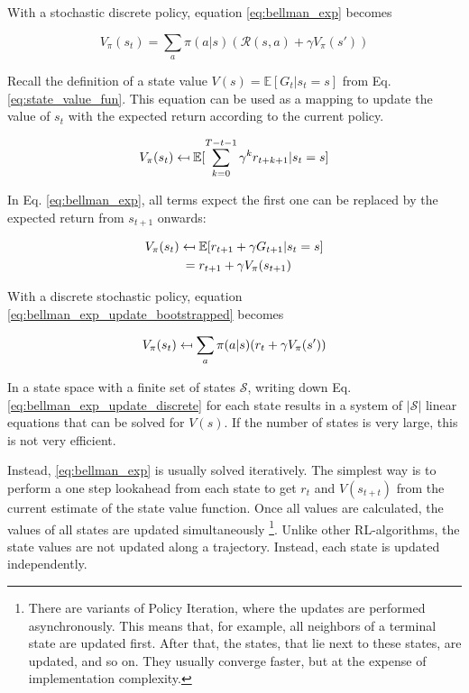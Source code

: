 With a stochastic discrete policy, equation \ref{eq:bellman_exp} becomes

\begin{equation}
V_\pi(s_t)=\sum_{a}\pi(a|s)(\mathcal{R}(s,a)+\gamma V_\pi(s'))
\label{eq:bellman_exp_discrete_policy}
\end{equation}

Recall the definition of a state value $V(s) = \mathbb{E}[G_t|s_t=s]$ from Eq. \ref{eq:state_value_fun}. This equation can be used as a mapping to update the value of $s_t$ with the expected return according to the current policy.

\begin{equation}
V_\pi(s_t) \mathrel{\reflectbox{\ensuremath{\mapsto}}} \mathbb{E}[ \sum_{k=0}^{T-t-1}\gamma^k r_{t+k+1}|s_t=s]
\label{eq:bellman_exp_update}
\end{equation}

In Eq. \ref{eq:bellman_exp}, all terms expect the first one can be replaced by the expected return from $s_{t+1}$ onwards:

\begin{align}
V_\pi(s_t) \mathrel{\reflectbox{\ensuremath{\mapsto}}} 
&\;\mathbb{E}[r_{t+1}+\gamma G_{t+1}|s_t=s]\\
=&\;r_{t+1}+\gamma V_\pi(s_{t+1})
\label{eq:bellman_exp_update_bootstrapped}
\end{align}

With a discrete stochastic policy, equation \ref{eq:bellman_exp_update_bootstrapped} becomes


\begin{equation}
V_{\pi}(s_t) \mathrel{\reflectbox{\ensuremath{\mapsto}}} \sum_{a}\pi(a|s)(r_t+\gamma V_\pi(s'))
\label{eq:bellman_exp_update_discrete}
\end{equation}

In a state space with a finite set of states $\mathcal{S}$, writing down Eq. \ref{eq:bellman_exp_update_discrete} for each state results in a system of $|\mathcal{S}|$ linear equations that can be solved for $V(s)$. If the number of states is very large, this is not very efficient. 

Instead, \ref{eq:bellman_exp} is usually solved iteratively. The simplest way is to perform a one step lookahead from each state to get $r_t$ and $V(s_{t+t})$ from the current estimate of the state value function. Once all values are calculated, the values of all states are updated simultaneously \footnote{There are variants of Policy Iteration, where the updates are performed asynchronously. This means that, for example, all neighbors of a terminal state are updated first. After that, the states, that lie next to these states, are updated, and so on. They usually converge faster, but at the expense of implementation complexity.}. Unlike other RL-algorithms, the state values are not updated along a trajectory. Instead, each state is updated independently.

